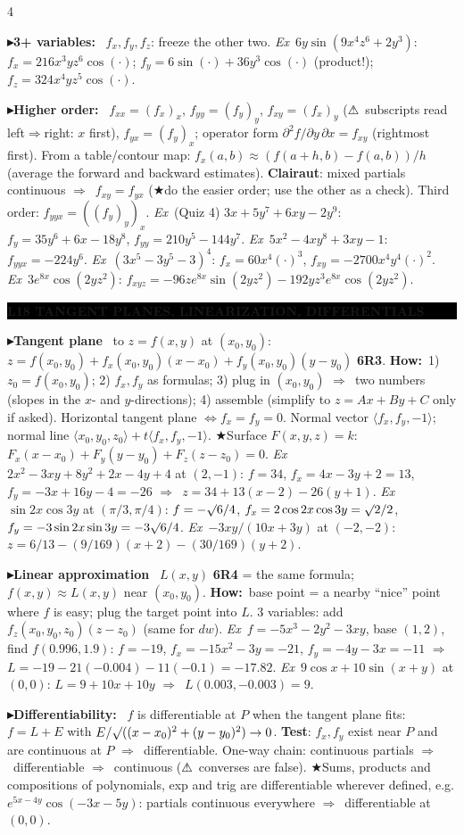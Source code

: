 \documentclass{article}
\newcommand\ip[1]{\langle #1\rangle}          %
\newcommand\sh[1]{{\setlength\fboxsep{0.18pt}\colorbox{black!22}{\textbf{#1}}}} %
\newcommand\hd[1]{\par\vspace{0.5pt}\needspace{4\baselineskip}\noindent
  {\setlength\fboxsep{0.45pt}\colorbox{black}{\parbox{\dimexpr\linewidth-2\fboxsep}{\color{white}\bfseries #1}}}\par\nobreak\vspace{0.2pt}\nobreak}
\newcommand\pt[1]{\par\textbf{{\symf ▸}#1}\ }  %
\newcommand\ex{\textit{Ex}\ }                  %
\newcommand\how{\textbf{How:}\ }
\newcommand\warn{{\symf ⚠}}                    %
\newcommand\shc{{\symf ★}}                      %
\newcommand\rt{\smash{\surd}}               %
\newcommand\then{\ensuremath{\Rightarrow}}
\begin{document}
\begin{multicols*}{4}
\pt{3+ variables:} $f_x,f_y,f_z$: freeze the other two. \ex $6y\sin(9x^4z^6+2y^3)$: $f_x=216x^3yz^6\cos(\cdot)$; $f_y=6\sin(\cdot)+36y^3\cos(\cdot)$ (product!); $f_z=324x^4yz^5\cos(\cdot)$.

\pt{Higher order:} $f_{xx}=(f_x)_x$, $f_{yy}=(f_y)_y$, $f_{xy}=(f_x)_y$ (\warn\ subscripts read left\then right: $x$ first), $f_{yx}=(f_y)_x$; operator form $\partial^2f/\partial y\,\partial x=f_{xy}$ (rightmost first). From a table/contour map: $f_x(a,b)\approx(f(a+h,b)-f(a,b))/h$ (average the forward and backward estimates). \textbf{Clairaut}: mixed partials continuous \then\ $f_{xy}=f_{yx}$ (\shc do the easier order; use the other as a check). Third order: $f_{yyx}=((f_y)_y)_x$. \ex (Quiz 4) $3x+5y^7+6xy-2y^9$: $f_y=35y^6+6x-18y^8$, $f_{yy}=210y^5-144y^7$. \ex $5x^2-4xy^8+3xy-1$: $f_{yyx}=-224y^6$. \ex $(3x^5-3y^5-3)^4$: $f_x=60x^4(\cdot)^3$, $f_{xy}=-2700x^4y^4(\cdot)^2$. \ex $3e^{8x}\cos(2yz^2)$: $f_{xyz}=-96ze^{8x}\sin(2yz^2)-192yz^3e^{8x}\cos(2yz^2)$.

\hd{L18 TANGENT PLANES, LINEARIZATION, DIFFERENTIALS}
\pt{Tangent plane} to $z=f(x,y)$ at $(x_0,y_0)$: $z=f(x_0,y_0)+f_x(x_0,y_0)(x-x_0)+f_y(x_0,y_0)(y-y_0)$ \sh{6R3}. \how 1) $z_0=f(x_0,y_0)$; 2) $f_x,f_y$ as formulas; 3) plug in $(x_0,y_0)$ \then\ two numbers (slopes in the $x$- and $y$-directions); 4) assemble (simplify to $z=Ax+By+C$ only if asked). Horizontal tangent plane $\iff f_x=f_y=0$. Normal vector $\ip{f_x,f_y,-1}$; normal line $\ip{x_0,y_0,z_0}+t\ip{f_x,f_y,-1}$. \shc Surface $F(x,y,z)=k$: $F_x(x-x_0)+F_y(y-y_0)+F_z(z-z_0)=0$. \ex $2x^2-3xy+8y^2+2x-4y+4$ at $(2,-1)$: $f=34$, $f_x=4x-3y+2=13$, $f_y=-3x+16y-4=-26$ \then\ $z=34+13(x-2)-26(y+1)$. \ex $\sin2x\cos3y$ at $(\pi/3,\pi/4)$: $f=-\rt6/4$, $f_x=2\cos2x\cos3y=\rt2/2$, $f_y=-3\sin2x\sin3y=-3\rt6/4$. \ex $-3xy/(10x+3y)$ at $(-2,-2)$: $z=6/13-(9/169)(x+2)-(30/169)(y+2)$.

\pt{Linear approximation} $L(x,y)$ \sh{6R4} = the same formula; $f(x,y)\approx L(x,y)$ near $(x_0,y_0)$. \how base point = a nearby ``nice'' point where $f$ is easy; plug the target point into $L$. 3 variables: add $f_z(x_0,y_0,z_0)(z-z_0)$ (same for $dw$). \ex $f=-5x^3-2y^2-3xy$, base $(1,2)$, find $f(0.996,1.9)$: $f=-19$, $f_x=-15x^2-3y=-21$, $f_y=-4y-3x=-11$ \then\ $L=-19-21(-0.004)-11(-0.1)=-17.82$. \ex $9\cos x+10\sin(x+y)$ at $(0,0)$: $L=9+10x+10y$ \then\ $L(0.003,-0.003)=9$.

\pt{Differentiability:} $f$ is differentiable at $P$ when the tangent plane fits: $f=L+E$ with $E/\rt((x-x_0)^2+(y-y_0)^2)\to0$. \textbf{Test}: $f_x,f_y$ exist near $P$ and are continuous at $P$ \then\ differentiable. One-way chain: continuous partials \then\ differentiable \then\ continuous (\warn\ converses are false). \shc Sums, products and compositions of polynomials, exp and trig are differentiable wherever defined, e.g. $e^{5x-4y}\cos(-3x-5y)$: partials continuous everywhere \then\ differentiable at $(0,0)$.


\end{multicols*}
\end{document}
